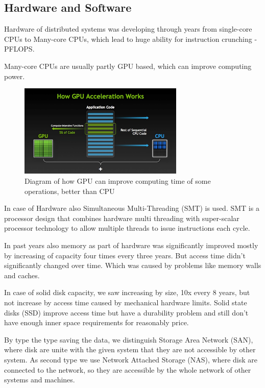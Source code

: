 \documentclass[12pt]{report}
\begin{document}
\subsection*{Hardware and Software}
Hardware of distributed systems was developing through years from single-core CPUs to Many-core CPUs, which lead to huge ability for instruction crunching - PFLOPS.

Many-core CPUs are usually partly GPU based, which can improve computing power.

\begin{figure}[ht]
\centering
     \includegraphics[width=0.7\textwidth]{img4.png}
      \caption{Diagram of how GPU can improve computing time of some operations, better than CPU \cite{nvidia}}
       \label{img4}
\end{figure}    

In case of Hardware also Simultaneous Multi-Threading (SMT) is used. SMT is a processor design that combines hardware multi threading with super-scalar processor technology to allow multiple threads to issue instructions each cycle.

In past years also memory as part of hardware was significantly improved mostly by increasing of capacity four times every three years. But access time didn’t significantly
changed over time. Which was caused by problems like memory walls and caches.

In case of solid disk capacity, we saw increasing by size, 10x every 8 years, but not increase by access time caused by mechanical hardware limits. Solid state disks (SSD) improve access time
but have a durability problem and still don't have enough inner space requirements for reasonably price.

By type the type saving the data, we distinguish Storage Area Network (SAN), where disk are unite with the given system that they are not accessible by other system. As second type we use Network Attached Storage (NAS), where disk are connected to the network, so they are accessible by the whole network of other systems and machines.
\end{document}
